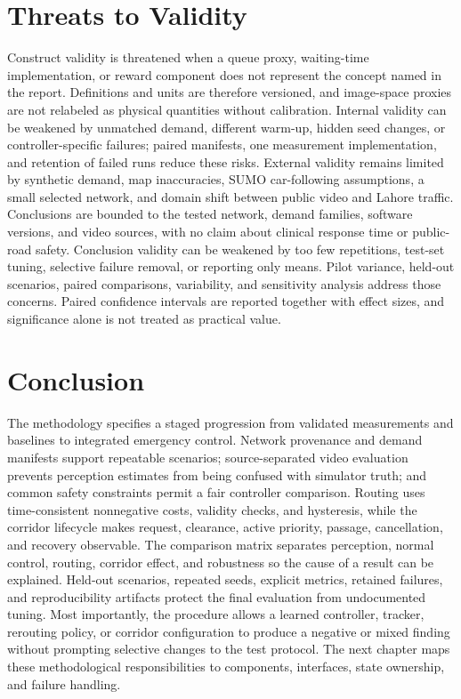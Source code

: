 \section{Threats to Validity}

Construct validity is threatened when a queue proxy, waiting-time implementation, or reward component does not represent the concept named in the report. Definitions and units are therefore versioned, and image-space proxies are not relabeled as physical quantities without calibration. Internal validity can be weakened by unmatched demand, different warm-up, hidden seed changes, or controller-specific failures; paired manifests, one measurement implementation, and retention of failed runs reduce these risks. External validity remains limited by synthetic demand, map inaccuracies, SUMO car-following assumptions, a small selected network, and domain shift between public video and Lahore traffic. Conclusions are bounded to the tested network, demand families, software versions, and video sources, with no claim about clinical response time or public-road safety. Conclusion validity can be weakened by too few repetitions, test-set tuning, selective failure removal, or reporting only means. Pilot variance, held-out scenarios, paired comparisons, variability, and sensitivity analysis address those concerns. Paired confidence intervals are reported together with effect sizes, and significance alone is not treated as practical value.

\section{Conclusion}

The methodology specifies a staged progression from validated measurements and baselines to integrated emergency control. Network provenance and demand manifests support repeatable scenarios; source-separated video evaluation prevents perception estimates from being confused with simulator truth; and common safety constraints permit a fair controller comparison. Routing uses time-consistent nonnegative costs, validity checks, and hysteresis, while the corridor lifecycle makes request, clearance, active priority, passage, cancellation, and recovery observable. The comparison matrix separates perception, normal control, routing, corridor effect, and robustness so the cause of a result can be explained. Held-out scenarios, repeated seeds, explicit metrics, retained failures, and reproducibility artifacts protect the final evaluation from undocumented tuning. Most importantly, the procedure allows a learned controller, tracker, rerouting policy, or corridor configuration to produce a negative or mixed finding without prompting selective changes to the test protocol. The next chapter maps these methodological responsibilities to components, interfaces, state ownership, and failure handling.
